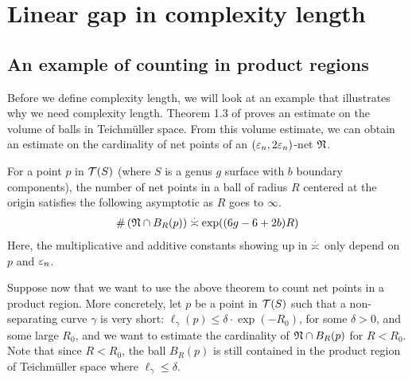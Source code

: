 \section{Linear gap in complexity length}
\label{sec:line-gap-compl}

\subsection{An example of counting in product regions}
\label{sec:an-example-counting}

Before we define complexity length, we will look at an example that illustrates why we need complexity length.
Theorem 1.3 of \textcite{10.1215/00127094-1548443} proves an estimate on the volume of balls in Teichmüller space.
From this volume estimate, we can obtain an estimate on the cardinality of net points of an $(\varepsilon_n, 2 \varepsilon_n)$-net $\mathfrak{N}$.
\begin{theorem}
  \label{thm:abem}
  For a point $p$ in $\mathcal{T}(S)$ (where $S$ is a genus $g$ surface with $b$ boundary components), the number of net points in a ball of radius $R$ centered at the origin satisfies the following asymptotic as $R$ goes to $\infty$.
  \begin{align*}
    \#\left( \net \cap B_R(p) \right) \emul \exp((6g-6 + 2b)R)
  \end{align*}
  Here, the multiplicative and additive constants showing up in $\emul$ only depend on $p$ and $\varepsilon_n$.
\end{theorem}

Suppose now that we want to use the above theorem to count net points in a product region.
More concretely, let $p$ be a point in $\mathcal{T}(S)$ such that a non-separating curve $\gamma$ is very short: $\ell_{\gamma}(p) \leq \delta \cdot \exp(-R_0)$, for some $\delta > 0$, and some large $R_0$, and we want to estimate the cardinality of $\mathfrak{N} \cap B_R(p)$ for $R < R_0$.
Note that since $R < R_0$, the ball $B_R(p)$ is still contained in the product region of Teichmüller space where $\ell_\gamma \leq \delta$.


